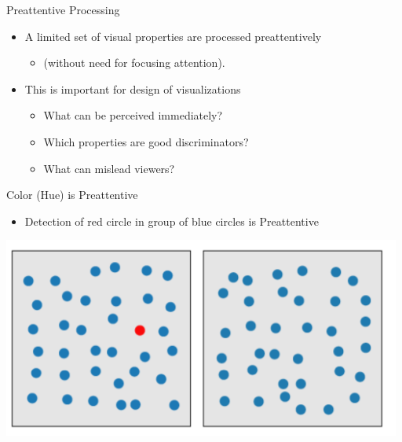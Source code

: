 \documentclass{beamer}
\begin{document}
\begin{frame}{Preattentive Processing} 
    \begin{itemize}
        \item A limited set of visual properties are processed preattentively
        \begin{itemize}
            \item (without need for focusing attention).
        \end{itemize}
        \item This is important for design of visualizations
        \begin{itemize}
            \item What can be perceived immediately?
            \item Which properties are good discriminators?
            \item What can mislead viewers?
        \end{itemize}
    \end{itemize}
\end{frame}  

\begin{frame}{Color (Hue) is Preattentive} 
    \begin{itemize}
        \item Detection of red circle in group of blue circles is Preattentive
    \end{itemize}
    \begin{center}
        \includegraphics[scale=0.4]{preattentive1.png}
    \end{center}
\end{frame}  
\end{document}
